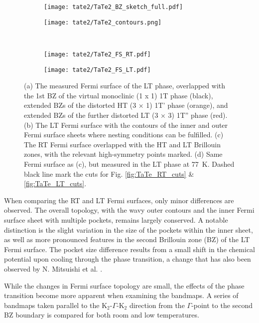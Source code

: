 \begin{figure}[t!]
	\centering
	\begin{subfigure}[b]{0.49\textwidth}
		\texttt{[image: tate2/TaTe2\_BZ\_sketch\_full.pdf]}
		\caption{}
	\end{subfigure}
	\hfill
	\begin{subfigure}[b]{0.49\textwidth}
		\texttt{[image: tate2/TaTe2\_contours.png]}
		\caption{}
	\end{subfigure}
	\\
	\begin{subfigure}[b]{0.49\textwidth}
		\texttt{[image: tate2/TaTe2\_FS\_RT.pdf]}
		\caption{}
	\end{subfigure}
	\hfill
	\begin{subfigure}[b]{0.49\textwidth}
		\texttt{[image: tate2/TaTe2\_FS\_LT.pdf]}
		\caption{}
	\end{subfigure}
	\caption{(a) The measured Fermi surface of the LT phase, overlapped with the 1st BZ of the virtual monoclinic (1 x 1) 1T phase (black), extended BZs of the distorted HT (3 × 1) 1T' phase (orange), and extended BZs of the further distorted LT (3 × 3) 1T'' phase (red). (b) The LT Fermi surface with the contours of the inner and outer Fermi surface sheets where nesting conditions can be fulfilled. (c) The RT Fermi surface overlapped with the HT and LT Brillouin zones, with the relevant high-symmetry points marked. (d) Same Fermi surface as (c), but measured in the LT phase at \qty{77}{\kelvin}. Dashed black line mark the cuts for Fig. \ref{fig:TaTe_RT_cuts} \& \ref{fig:TaTe_LT_cuts}.}
	\label{fig:TaTe_FS}
\end{figure}

When comparing the RT and LT Fermi surfaces, only minor differences are observed.
The overall topology, with the wavy outer contours and the inner Fermi surface sheet with multiple pockets, remains largely conserved.
A notable distinction is the slight variation in the size of the pockets within the inner sheet, as well as more pronounced features in the second Brillouin zone (BZ) of the LT Fermi surface.
The pocket size difference results from a small shift in the chemical potential upon cooling through the phase transition, a change that has also been observed by N. Mitsuishi et al. \cite{mitsuishi_unveiling_2024}.

While the changes in Fermi surface topology are small, the effects of the phase transition become more apparent when examining the bandmaps.
A series of bandmaps taken parallel to the K$_2$-$\Gamma$-K$_2$ direction from the $\Gamma$-point to the second BZ boundary is compared for both room and low temperatures.

